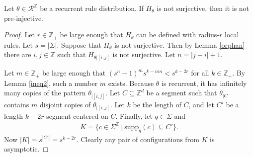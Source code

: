 \documentclass[runningheads]{llncs}
\newcommand{\Z}{\mathbb{Z}}
\newcommand{\set}[2]{\{ #1 \: | \: #2 \}}
\begin{document}
\begin{lemma} \label{rgoe1}
Let $\theta \in \mathcal{R}^\Z$ be a recurrent rule distribution. If $H_\theta$ is not surjective, then it is not pre-injective.
\end{lemma}



\begin{proof}
%
%
%
%

Let $r \in \Z_+$ be large enough that $H_\theta$ can be defined with radius-$r$ local rules. Let $s = |\Sigma|$. Suppose that $H_\theta$ is not surjective. Then by Lemma \ref{orphan} there are $i,j \in \Z$ such that $H_{\theta|[i,j]}$ is not surjective. Let $n = |j-i| +1$.

Let $m \in \Z_+$ be large enough that $(s^n-1)^m s^{k-nm} < s^{k-2r}$ for all $k \in \Z_+$. By Lemma \ref{ineq2}, such a number $m$ exists. Because $\theta$ is recurrent, it has infinitely many copies of the pattern $\theta_{|[i,j]}$. Let $C \subseteq \Z^d$ be a segment such that $\theta_{|C}$ contains $m$ disjoint copies of $\theta_{|[i,j]}$. Let $k$ be the length of $C$, and let $C'$ be a length $k-2r$ segment centered on $C$. Finally, let $q\in \Sigma$ and
\begin{align*}
K = \set{c \in \Sigma^\Z}{\mathrm{supp}_q (c) \subseteq C'}.
\end{align*}
Now $|K| = s^{|C'|} = s^{k-2r}$. Clearly any pair of configurations from $K$ is asymptotic.


\end{proof}
\end{document}

